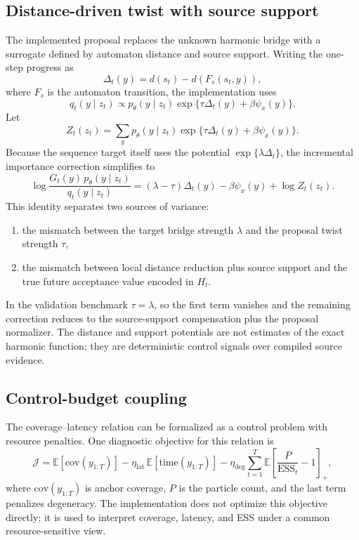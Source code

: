 \documentclass[11pt]{article}
\begin{document}
\subsection{Distance-driven twist with source support}
The implemented proposal replaces the unknown harmonic bridge with a surrogate defined by automaton distance and source support. Writing the one-step progress as
\[
\Delta_t(y) = d(s_t) - d(F_s(s_t,y)),
\]
where $F_s$ is the automaton transition, the implementation uses
\[
q_t(y \mid z_t) \propto p_\theta(y \mid z_t)\exp\{\tau \Delta_t(y) + \beta \psi_x(y)\}.
\]
Let
\[
Z_t(z_t) = \sum_y p_\theta(y \mid z_t)\exp\{\tau \Delta_t(y) + \beta \psi_x(y)\}.
\]
Because the sequence target itself uses the potential $\exp\{\lambda \Delta_t\}$, the incremental importance correction simplifies to
\[
\log \frac{G_t(y)\,p_\theta(y \mid z_t)}{q_t(y \mid z_t)}
=
(\lambda-\tau)\Delta_t(y) - \beta \psi_x(y) + \log Z_t(z_t).
\]
This identity separates two sources of variance:
\begin{enumerate}[leftmargin=1.5em]
  \item the mismatch between the target bridge strength $\lambda$ and the proposal twist strength $\tau$,
  \item the mismatch between local distance reduction plus source support and the true future acceptance value encoded in $H_t$.
\end{enumerate}
In the validation benchmark $\tau=\lambda$, so the first term vanishes and the remaining correction reduces to the source-support compensation plus the proposal normalizer. The distance and support potentials are not estimates of the exact harmonic function; they are deterministic control signals over compiled source evidence.

\subsection{Control-budget coupling}
The coverage--latency relation can be formalized as a control problem with resource penalties. One diagnostic objective for this relation is
\[
\mathcal{J}
=
\mathbb{E}\!\left[\mathrm{cov}(y_{1:T})\right]
-\eta_{\mathrm{lat}}\,
\mathbb{E}\!\left[\mathrm{time}(y_{1:T})\right]
-\eta_{\mathrm{deg}}
\sum_{t=1}^{T}
\mathbb{E}\!\left[\frac{P}{\mathrm{ESS}_t}-1\right]_+,
\]
where $\mathrm{cov}(y_{1:T})$ is anchor coverage, $P$ is the particle count, and the last term penalizes degeneracy. The implementation does not optimize this objective directly; it is used to interpret coverage, latency, and ESS under a common resource-sensitive view.
\end{document}
